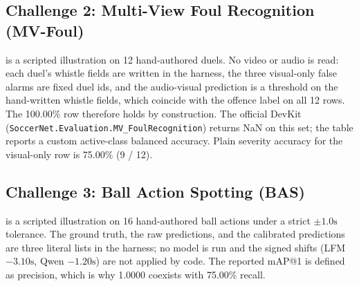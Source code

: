 \documentclass[10pt,twocolumn,letterpaper]{article}
\begin{document}
\subsection{Challenge 2: Multi-View Foul Recognition (MV-Foul)}
 is a scripted illustration on 12 hand-authored duels. No video or audio is read: each duel's whistle fields are written in the harness, the three visual-only false alarms are fixed duel ids, and the audio-visual prediction is a threshold on the hand-written whistle fields, which coincide with the offence label on all 12 rows. The 100.00\% row therefore holds by construction.
The official DevKit (\texttt{SoccerNet.Evaluation.MV\_FoulRecognition}) returns NaN on this set; the table reports a custom active-class balanced accuracy. Plain severity accuracy for the visual-only row is 75.00\% (9 / 12).

\begin{table}[h]
\centering
\small
\caption{\textbf{Track D MV-Foul scripted whistle-gating illustration ($N=12$ hand-authored duels, custom active-class metric; not a model measurement).}}
\label{tab:mv_foul}
\end{table}

\subsection{Challenge 3: Ball Action Spotting (BAS)}
 is a scripted illustration on 16 hand-authored ball actions under a strict $\pm 1.0\text{s}$ tolerance. The ground truth, the raw predictions, and the calibrated predictions are three literal lists in the harness; no model is run and the signed shifts (LFM $-3.10\text{s}$, Qwen $-1.20\text{s}$) are not applied by code. The reported mAP@1 is defined as precision, which is why 1.0000 coexists with 75.00\% recall.
\end{document}
